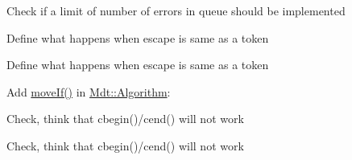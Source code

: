 
\begin{DoxyRefList}
\item[\label{todo__todo000005}%
\hypertarget{todo__todo000005}{}%
Namespace \hyperlink{namespace_mdt}{Mdt} ]Check if a limit of number of errors in queue should be implemented  
\item[\label{todo__todo000001}%
\hypertarget{todo__todo000001}{}%
Member \hyperlink{namespace_mdt_1_1_algorithm_aadf56549e804ffc292f5b61d4872512b}{Mdt\+:\+:Algorithm\+:\+:index\+Of\+First\+Escaped\+Token} (const Q\+String \&str, int from, const std\+::vector$<$ Q\+Char $>$ \&tokens, const Q\+Char \&escape)]Define what happens when escape is same as a token  
\item[\label{todo__todo000002}%
\hypertarget{todo__todo000002}{}%
Member \hyperlink{namespace_mdt_1_1_algorithm_a25b3247b25cdf25db6a2641269e37e0d}{Mdt\+:\+:Algorithm\+:\+:index\+Of\+First\+Non\+Escaped\+Token} (const Q\+String \&str, int from, const std\+::vector$<$ Q\+Char $>$ \&tokens, const Q\+Char \&escape)]Define what happens when escape is same as a token  
\item[\label{todo__todo000003}%
\hypertarget{todo__todo000003}{}%
Member \hyperlink{namespace_mdt_1_1_algorithm_a1f739be25cc7de2c30a21b85d9b25f0a}{Mdt\+:\+:Algorithm\+:\+:move\+If} (Forward\+It first, Forward\+It last, Output\+It d\+\_\+first, Unary\+Predicate p)]Add \hyperlink{namespace_mdt_1_1_algorithm_a1f739be25cc7de2c30a21b85d9b25f0a}{move\+If()} in \hyperlink{namespace_mdt_1_1_algorithm}{Mdt\+::\+Algorithm}\+:

Check, think that cbegin()/cend() will not work

Check, think that cbegin()/cend() will not work
\end{DoxyRefList}